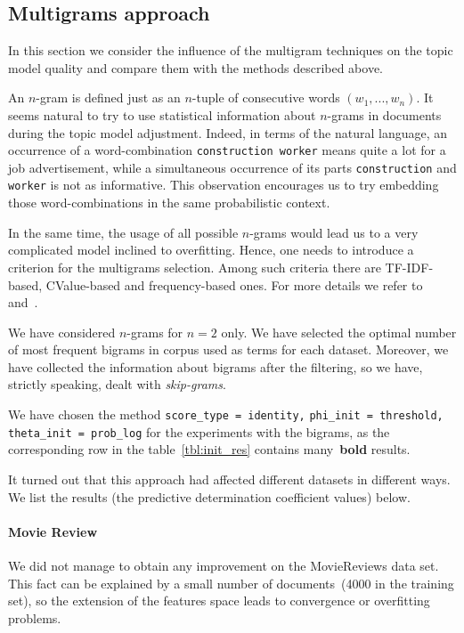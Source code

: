 \documentclass{sig-alternate-2013}
\begin{document}

\subsection{Multigrams approach}
In this section we consider the influence of the multigram techniques on the topic model quality and compare them with the methods described above.

An $n$-gram is defined just as an $n$-tuple of consecutive words $(w_1, ..., w_n)$. It seems natural to try to use statistical information about $n$-grams in documents during the topic model adjustment. Indeed, in terms of the natural language, an occurrence of a word-combination \texttt{construction worker} means quite a lot for a job advertisement, while a simultaneous occurrence of its parts \texttt{construction} and \texttt{worker} is not as informative. This observation encourages us to try embedding those word-combinations in the same probabilistic context.

In the same time, the usage of all possible $n$-grams would lead us to a very complicated model inclined to overfitting.
Hence, one needs to introduce a criterion for the multigrams selection. Among such criteria there are TF-IDF-based, CValue-based and frequency-based ones. For more details we refer to~\cite{multiobzor} and~\cite{cvalue}.

We have considered $n$-grams for $n=2$ only. We have selected the optimal number of most frequent bigrams in corpus used as terms for each dataset. Moreover, we have collected the information about bigrams after the filtering, so we have, strictly speaking, dealt with \emph{skip-grams}.

We have chosen the method \texttt{score\_type = identity,}
\texttt{phi\_init = threshold,}
\texttt{theta\_init = prob\_log} for the experiments with the bigrams,
as the corresponding row in the table~\ref{tbl:init_res} contains many~\textbf{bold} results.

It turned out that this approach had affected different datasets in different ways.
We list the results (the predictive determination coefficient values) below.

\paragraph{Movie Review}
We did not manage to obtain any improvement on the MovieReviews data set.
This fact can be explained by a small number of documents~(4000 in the training set),
so the extension of the features space leads to convergence or overfitting problems.
\end{document}
